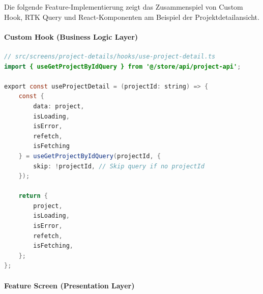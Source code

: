 Die folgende Feature-Implementierung zeigt das Zusammenspiel von Custom Hook, RTK Query und React-Komponenten am Beispiel der Projektdetailansicht.

\paragraph{Custom Hook (Business Logic Layer)}\mbox{}\vspace{4pt}

\begin{lstlisting}[language=Java, caption=useProjectDetail - Custom Hook, label=lst:use_project_detail]
// src/screens/project-details/hooks/use-project-detail.ts
import { useGetProjectByIdQuery } from '@/store/api/project-api';

export const useProjectDetail = (projectId: string) => {
    const { 
        data: project, 
        isLoading, 
        isError, 
        refetch, 
        isFetching 
    } = useGetProjectByIdQuery(projectId, {
        skip: !projectId, // Skip query if no projectId
    });

    return {
        project,
        isLoading,
        isError,
        refetch,
        isFetching,
    };
};
\end{lstlisting}

\paragraph{Feature Screen (Presentation Layer)}\mbox{}\vspace{4pt}

